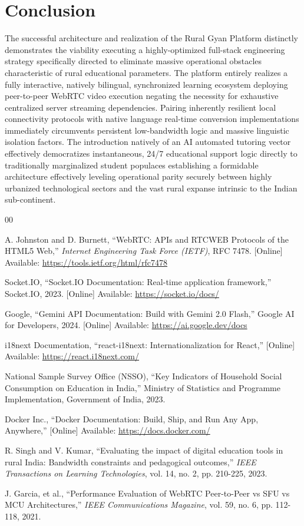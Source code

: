 \documentclass[12pt, journal, onecolumn]{IEEEtran}
\begin{document}
\section{Conclusion}
The successful architecture and realization of the Rural Gyan Platform distinctly demonstrates the viability executing a highly-optimized full-stack engineering strategy specifically directed to eliminate massive operational obstacles characteristic of rural educational parameters. The platform entirely realizes a fully interactive, natively bilingual, synchronized learning ecosystem deploying peer-to-peer WebRTC video execution negating the necessity for exhaustive centralized server streaming dependencies. Pairing inherently resilient local connectivity protocols with native language real-time conversion implementations immediately circumvents persistent low-bandwidth logic and massive linguistic isolation factors. The introduction natively of an AI automated tutoring vector effectively democratizes instantaneous, 24/7 educational support logic directly to traditionally marginalized student populaces establishing a formidable architecture effectively leveling operational parity securely between highly urbanized technological sectors and the vast rural expanse intrinsic to the Indian sub-continent.

\begin{thebibliography}{00}

A. Johnston and D. Burnett, ``WebRTC: APIs and RTCWEB Protocols of the HTML5 Web,'' \textit{Internet Engineering Task Force (IETF)}, RFC 7478. [Online] Available: \url{https://tools.ietf.org/html/rfc7478}

Socket.IO, ``Socket.IO Documentation: Real-time application framework,'' Socket.IO, 2023. [Online] Available: \url{https://socket.io/docs/}

Google, ``Gemini API Documentation: Build with Gemini 2.0 Flash,'' Google AI for Developers, 2024. [Online] Available: \url{https://ai.google.dev/docs}

i18next Documentation, ``react-i18next: Internationalization for React,'' [Online] Available: \url{https://react.i18next.com/}

National Sample Survey Office (NSSO), ``Key Indicators of Household Social Consumption on Education in India,'' Ministry of Statistics and Programme Implementation, Government of India, 2023.

Docker Inc., ``Docker Documentation: Build, Ship, and Run Any App, Anywhere,'' [Online] Available: \url{https://docs.docker.com/}

R. Singh and V. Kumar, ``Evaluating the impact of digital education tools in rural India: Bandwidth constraints and pedagogical outcomes,'' \textit{IEEE Transactions on Learning Technologies}, vol. 14, no. 2, pp. 210-225, 2023.

J. Garcia, et al., ``Performance Evaluation of WebRTC Peer-to-Peer vs SFU vs MCU Architectures,'' \textit{IEEE Communications Magazine}, vol. 59, no. 6, pp. 112-118, 2021.

\end{thebibliography}
\end{document}
